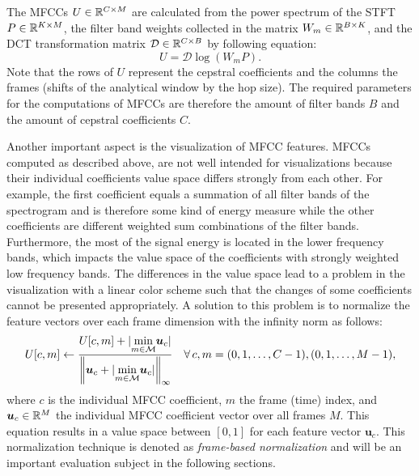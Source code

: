 \FloatBarrier
\noindent
The MFCCs $U \in \mathbb{R}^{C \times M}$ are calculated from the power spectrum of the STFT $P \in \mathbb{R}^{K \times M}$, the filter band weights collected in the matrix $W_m \in \mathbb{R}^{B \times K}$, and the DCT transformation matrix $\mathcal{D} \in \mathbb{R}^{C \times B}$ by following equation:
\begin{equation}\label{eq:signal_mfcc_mfcc}
  U = \mathcal{D} \log{ \left( W_m   P \right) }.
\end{equation}
Note that the rows of $U$ represent the cepstral coefficients and the columns the frames (shifts of the analytical window by the hop size).
The required parameters for the computations of MFCCs are therefore the amount of filter bands $B$ and the amount of cepstral coefficients $C$.

Another important aspect is the visualization of MFCC features.
MFCCs computed as described above, are not well intended for visualizations because their individual coefficients value space differs strongly from each other.
For example, the first coefficient equals a summation of all filter bands of the spectrogram and is therefore some kind of energy measure while the other coefficients are different weighted sum combinations of the filter bands.
Furthermore, the most of the signal energy is located in the lower frequency bands, which impacts the value space of the coefficients with strongly weighted low frequency bands.
The differences in the value space lead to a problem in the visualization with a linear color scheme such that the changes of some coefficients cannot be presented appropriately.
A solution to this problem is to normalize the feature vectors over each frame dimension with the infinity norm as follows:
\begin{equation}\label{eq:signal_mfcc_norm}
  U[c, m] \gets \frac{U[c, m] + \vert \underset{m \in \mathcal{M}}{\min} \bm{u}_c \vert}{\norm{\bm{u}_c + \vert \underset{m \in \mathcal{M}}{\min} \bm{u}_c \vert}_\infty} \quad \forall \, c, m = (0, 1, \dots, C - 1), (0, 1, \dots, M - 1),
\end{equation}
where $c$ is the individual MFCC coefficient, $m$ the frame (time) index, and $\bm{u}_c \in \mathbb{R}^M$ the individual MFCC coefficient vector over all frames $M$.
This equation results in a value space between $[0, 1]$ for each feature vector $\bm{u}_c$.
This normalization technique is denoted as \emph{frame-based normalization} and will be an important evaluation subject in the following sections.

